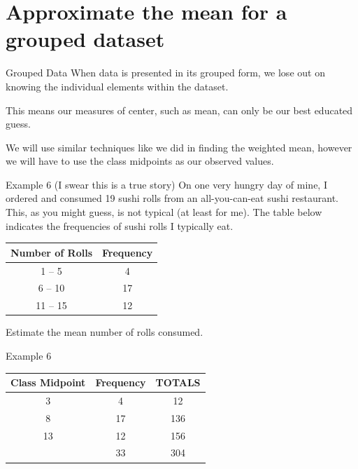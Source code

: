 \documentclass[t]{beamer}
\begin{document}
\section{Approximate the mean for a grouped dataset}

\begin{frame}{Grouped Data}
When data is presented in its grouped form, we lose out on knowing the individual elements within the dataset. \newline\\	\pause

This means our measures of center, such as mean, can only be our best educated guess.	\newline\\	\pause

We will use similar techniques like we did in finding the weighted mean, however we will have to use the class midpoints as our observed values.
\end{frame}

\begin{frame}{Example 6}
(I swear this is a true story) On one very hungry day of mine, I ordered and consumed 19 sushi rolls from an all-you-can-eat sushi restaurant. This, as you might guess, is not typical (at least for me). The table below indicates the frequencies of sushi rolls I typically eat.	\newline\\
\begin{center}
\begin{tabular}{|c|c|}
\textbf{Number of Rolls} & \textbf{Frequency} \\ \hline
1 -- 5		&	4	\\
6 -- 10		&	17	\\
11 -- 15	&	12	\\
\end{tabular}
\end{center} 

Estimate the mean number of rolls consumed.
\end{frame}

\begin{frame}{Example 6}
\begin{center}
\begin{tabular}{|c|c|c|}
\textbf{Class Midpoint} & \textbf{Frequency}	&	\textbf{TOTALS} \\ \hline
3		&	4	&	12	\\
8		&	17	&	136	\\
13		&	12	&	156 \\	\hline
		&	33	&	304	\\
\end{tabular}
\end{center} 
\vspace{8pt}
\end{frame}
\end{document}
